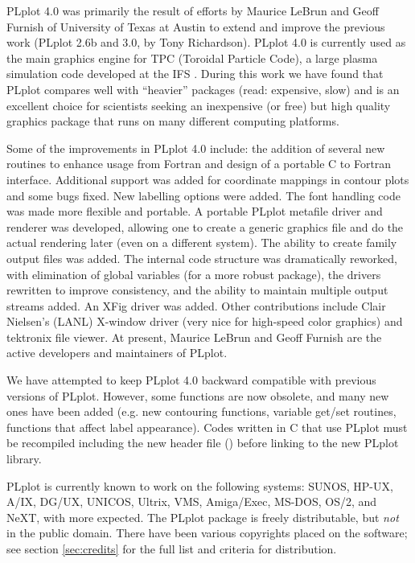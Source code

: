 PLplot 4.0 was primarily the result of efforts by Maurice LeBrun and
Geoff Furnish of University of Texas at Austin to extend and improve
the previous work (PLplot 2.6b and 3.0, by Tony Richardson).  PLplot
4.0 is currently used as the main graphics engine for TPC (Toroidal
Particle Code), a large plasma simulation code developed at the IFS
\cite{lebrun89a}.  During this work we have found that PLplot compares
well with ``heavier'' packages (read: expensive, slow) and is an
excellent choice for scientists seeking an inexpensive (or free) but
high quality graphics package that runs on many different computing
platforms.

Some of the improvements in PLplot 4.0 include: the addition of
several new routines to enhance usage from Fortran and design of a
portable C to Fortran interface.  Additional support was added for
coordinate mappings in contour plots and some bugs fixed.  New
labelling options were added.  The font handling code was made more
flexible and portable.  A portable PLplot metafile driver and renderer
was developed, allowing one to create a generic graphics file and do
the actual rendering later (even on a different system).  The ability
to create family output files was added.  The internal code structure
was dramatically reworked, with elimination of global variables (for a
more robust package), the drivers rewritten to improve consistency,
and the ability to maintain multiple output streams added.  An XFig
driver was added.  Other contributions include Clair Nielsen's (LANL)
X-window driver (very nice for high-speed color graphics) and
tektronix file viewer.  At present, Maurice LeBrun and Geoff Furnish
are the active developers and maintainers of PLplot.

We have attempted to keep PLplot 4.0 backward compatible with previous
versions of PLplot.  However, some functions are now obsolete, and
many new ones have been added (e.g.  new contouring functions,
variable get/set routines, functions that affect label appearance).
Codes written in C that use PLplot must be recompiled including the
new header file () before linking to the new PLplot
library.

PLplot is currently known to work on the following systems: SUNOS,
HP-UX, A/IX, DG/UX, UNICOS, Ultrix, VMS, Amiga/Exec, MS-DOS, OS/2, and
NeXT, with more expected.  The PLplot package is freely distributable,
but {\em not\/} in the public domain.  There have been various
copyrights placed on the software; see section \ref{sec:credits} for
the full list and criteria for distribution.

